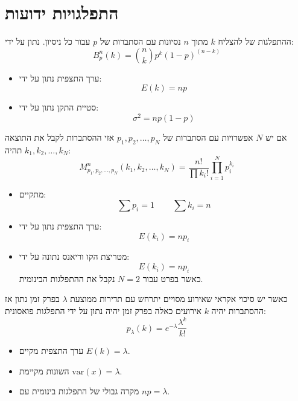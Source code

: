 \documentclass{tstextbook}
\begin{document}
\section{התפלגויות ידועות}

\begin{definition}
ההתפלגות של להצליח \(k\) מתוך \(n\) נסיונות עם הסתברות של \(p\) עבור כל ניסיון. נתון על ידי:
$$B_{p}^{n}(k)={\binom{n}{k}}p^{k}(1-p)^{(n-k)}$$

\end{definition}
\begin{proposition}
  \begin{itemize}
    \item ערך התצפית נתון על ידי:
$$E(k)=np$$
    \item סטיית התקן נתון על ידי:
$$\sigma^{2}=np(1-p)$$
  \end{itemize}
\end{proposition}
\begin{definition}
אם יש \(N\) אפשרויות עם הסתברות של \(p_{1},p_{2},\dots,p_{N}\) אזי ההסתברות לקבל את התוצאה \(k_{1},k_{2},\dots,k_{N}\) תהיה:
$$M_{p_{1},p_{2},\ldots,p_{N}}^{n}(k_{1},k_{2},\ldots,k_{N})={\frac{n!}{\prod k_{i}!}}\prod_{i=1}^{N}p_{i}^{k_{i}}$$

\end{definition}
\begin{proposition}
  \begin{itemize}
    \item מתקיים:
$$\sum p_{i}=1\,\qquad \sum k_{i}=n$$
    \item ערך התצפית נתון על ידי:
$$E(k_{i})=n p_{i}$$
    \item מטריצת הקו וריאנס נתונה על ידי:
$$E(k_{i})=n p_{i}$$
כאשר בפרט עבור \(N=2\) נקבל את ההתפלגות הבינומית.
  \end{itemize}
\end{proposition}
\begin{definition}
כאשר יש סיכוי אקראי שאירוע מסויים יתרחש עם תדירות ממוצעת \(\lambda\) בפרק זמן נתון אז ההסתברות יהיה \(k\) אירועים כאלה בפרק זמן יהיה נתון על ידי התפלגות פואסונית:
$$p_{\lambda}(k)=e^{-\lambda}\frac{\lambda^{k}}{k!}$$

\end{definition}
\begin{proposition}
  \begin{itemize}
    \item ערך התצפית מקיים \(E(k)=\lambda\).
    \item השונות מקיימת \(\mathrm{var}(x)=\lambda\).
    \item מקרה גבולי של התפלגות בינומית עם \(np=\lambda\).
  \end{itemize}
\end{proposition}
\end{document}
